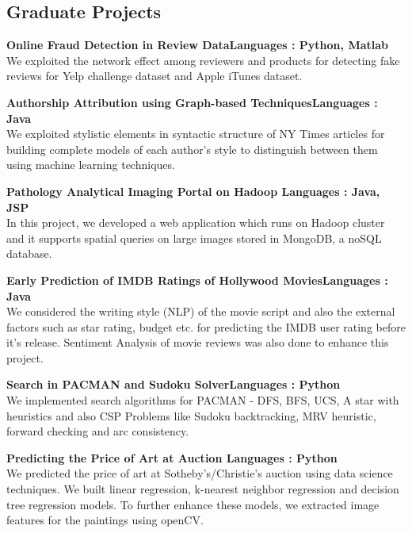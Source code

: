 \documentclass[margin,line,10.5pt]{res}
\begin{document}
\begin{resume}
\section{\sc Graduate Projects}

{\bf Online Fraud Detection in Review Data\hfill Languages : Python, Matlab}\\ 
We exploited the network effect among reviewers and products for detecting fake reviews for Yelp challenge dataset and Apple iTunes dataset. 

\vspace{-.08cm}

{\bf Authorship Attribution using Graph-based Techniques\hfill Languages : Java} \\ 
We exploited stylistic elements in syntactic structure of NY Times articles for building complete models of each author's style to distinguish between them using machine learning techniques. 

\vspace{-.08cm}

{\bf Pathology Analytical Imaging Portal on Hadoop \hfill Languages : Java, JSP}\\ 
In this project, we developed a web application which runs on Hadoop cluster and it supports spatial queries on large images stored in MongoDB, a noSQL database.

\vspace{-.08cm}

{\bf Early Prediction of IMDB Ratings of Hollywood Movies\hfill Languages : Java}\\
We considered the writing style (NLP) of the movie script and also the external factors such as star rating, budget etc. for predicting the IMDB user rating before it's release. Sentiment Analysis of movie reviews was also done to enhance this project.

\vspace{-.08cm}

{\bf Search in PACMAN and Sudoku Solver\hfill Languages : Python}\\
We implemented search algorithms for PACMAN - DFS, BFS, UCS, A star with heuristics and also CSP Problems like Sudoku backtracking, MRV heuristic, forward checking and arc consistency. 

\vspace{-.08cm}

{\bf Predicting the Price of Art at Auction \hfill Languages : Python}\\ 
We predicted the price of art at Sotheby's/Christie's auction using data science techniques. We built linear regression, k-nearest neighbor regression and decision tree regression models. To further enhance these models, we extracted image features for the paintings using openCV.


\end{resume}
\end{document}

